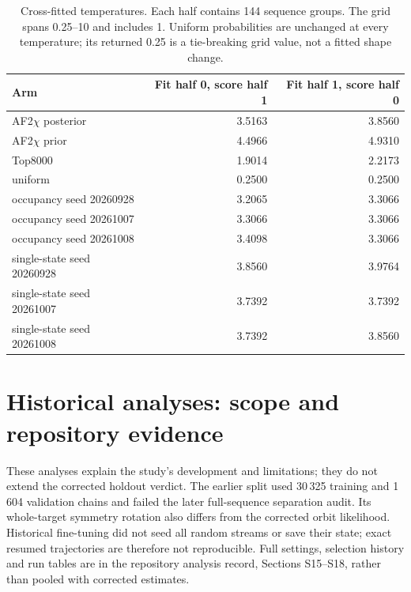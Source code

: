 \documentclass[10pt,a4paper]{article}
\begin{document}
\begin{table}[!htbp]
\centering
\caption{Cross-fitted temperatures. Each half contains 144 sequence groups. The grid spans 0.25--10 and includes 1. Uniform probabilities are unchanged at every temperature; its returned 0.25 is a tie-breaking grid value, not a fitted shape change.}
\label{tab:aftemperatures}
\small\setlength{\tabcolsep}{4pt}
\begin{tabular}{@{}lrr@{}}
\toprule
Arm & Fit half 0, score half 1 & Fit half 1, score half 0 \\
\midrule
AF2$\chi$ posterior & 3.5163 & 3.8560 \\
AF2$\chi$ prior & 4.4966 & 4.9310 \\
Top8000 & 1.9014 & 2.2173 \\
uniform & 0.2500 & 0.2500 \\
occupancy seed 20260928 & 3.2065 & 3.3066 \\
occupancy seed 20261007 & 3.3066 & 3.3066 \\
occupancy seed 20261008 & 3.4098 & 3.3066 \\
single-state seed 20260928 & 3.8560 & 3.9764 \\
single-state seed 20261007 & 3.7392 & 3.7392 \\
single-state seed 20261008 & 3.7392 & 3.8560 \\
\bottomrule
\end{tabular}
\end{table}


\section{Historical analyses: scope and repository evidence}
\label{sec:historicalcontext}
\label{sec:compositiondetail}
\label{sec:joint}

These analyses explain the study's development and limitations; they do not extend the corrected holdout verdict. The earlier split used 30\,325 training and 1\,604 validation chains and failed the later full-sequence separation audit. Its whole-target symmetry rotation also differs from the corrected orbit likelihood. Historical fine-tuning did not seed all random streams or save their state; exact resumed trajectories are therefore not reproducible. Full settings, selection history and run tables are in the repository analysis record, Sections S15--S18, rather than pooled with corrected estimates.
\end{document}
